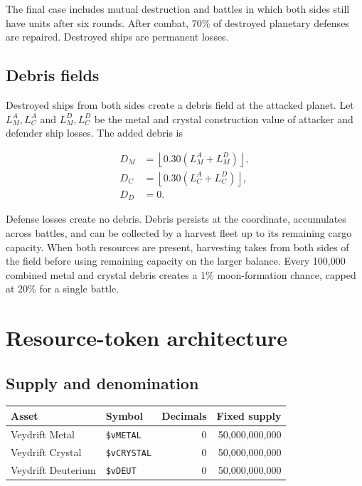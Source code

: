 \documentclass[11pt]{article}
\newcommand{\token}[1]{\texttt{\$#1}}
\begin{document}
The final case includes mutual destruction and battles in which both sides still have units after six rounds. After combat, 70\% of destroyed planetary defenses are repaired. Destroyed ships are permanent losses.

\subsection{Debris fields}

Destroyed ships from both sides create a debris field at the attacked planet. Let $L^A_M,L^A_C$ and $L^D_M,L^D_C$ be the metal and crystal construction value of attacker and defender ship losses. The added debris is

\begin{align}
D_M &= \left\lfloor0.30(L^A_M+L^D_M)\right\rfloor,\\
D_C &= \left\lfloor0.30(L^A_C+L^D_C)\right\rfloor,\\
D_D &= 0.
\end{align}

Defense losses create no debris. Debris persists at the coordinate, accumulates across battles, and can be collected by a harvest fleet up to its remaining cargo capacity. When both resources are present, harvesting takes from both sides of the field before using remaining capacity on the larger balance. Every 100,000 combined metal and crystal debris creates a 1\% moon-formation chance, capped at 20\% for a single battle.

\section{Resource-token architecture}

\subsection{Supply and denomination}

\begin{tabularx}{\textwidth}{@{}l l r r@{}}
\toprule
\textbf{Asset} & \textbf{Symbol} & \textbf{Decimals} & \textbf{Fixed supply} \\
\midrule
Veydrift Metal & \token{vMETAL} & 0 & 50,000,000,000 \\
Veydrift Crystal & \token{vCRYSTAL} & 0 & 50,000,000,000 \\
Veydrift Deuterium & \token{vDEUT} & 0 & 50,000,000,000 \\
\bottomrule
\end{tabularx}
\end{document}
